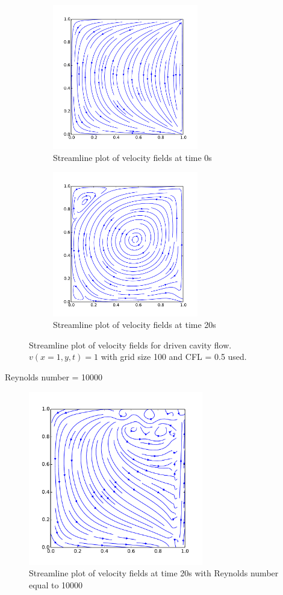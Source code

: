 \begin{figure}[H]
	\centering
	\begin{subfigure}[t]{2.5in}
		\centering
		\includegraphics[width=2.5in]{figures/streamline_plot_t_0s_grid_100.pdf}
		\caption{Streamline plot of velocity fields at time 0s}\label{fig:6.19a}		
	\end{subfigure}
	\quad
	\begin{subfigure}[t]{2.5in}
		\centering
		\includegraphics[width=2.5in]{figures/streamline_plot_t_ 20s_grid_100.pdf}
		\caption{Streamline plot of velocity fields at time 20s}\label{fig:6.19b}
	\end{subfigure}
	\caption{Streamline plot of velocity fields for driven cavity flow. $v(x=1,y,t) = 1$ with grid size 100 and CFL = 0.5 used.}\label{fig:6.16}
\end{figure}

Reynolds number = 10000
\begin{figure}[H]
	\centering
	\includegraphics[width=3.0in]{figures/streamline_plot_t_20_grid30_Re_10000.pdf}
	\caption{Streamline plot of velocity fields at time 20s with Reynolds number equal to 10000}\label{fig:6.19}		
\label{fig:6.16}
\end{figure}

